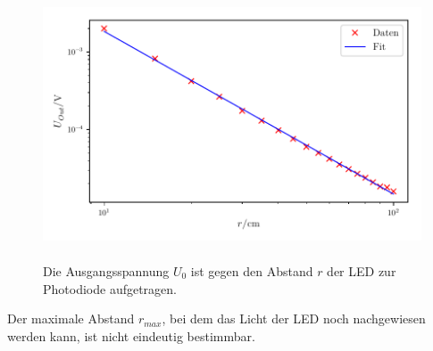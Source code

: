 \begin{figure}
    \centering
    \includegraphics[width=12cm, height=8cm]{build/plot4.pdf}
    \caption{Die Ausgangsspannung $U_{0}$ ist gegen den Abstand $r$ der LED zur Photodiode aufgetragen.}
    \label{fig:plot4}
\end{figure}

\noindent Der maximale Abstand $r_{max}$, bei dem das Licht der LED %
noch nachgewiesen werden kann, ist nicht eindeutig bestimmbar. 
